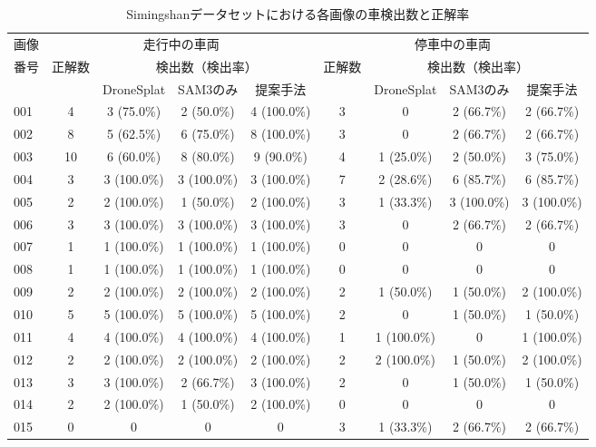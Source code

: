 \documentclass[a4paper,dvipdfmx,ja=standard,9pt]{bxjsarticle}
\begin{document}
\begin{table}[htbp]
  \centering
  \caption{Simingshanデータセットにおける各画像の車検出数と正解率}
  \small
  \begin{tabular}{lcccccccc}
    \toprule
    画像 & \multicolumn{4}{c}{走行中の車両} & \multicolumn{4}{c}{停車中の車両} \\
    \cmidrule(lr){2-5} \cmidrule(lr){6-9}
    番号 & 正解数 & \multicolumn{3}{c}{検出数（検出率）} & 正解数 & \multicolumn{3}{c}{検出数（検出率）} \\
    \cmidrule(lr){3-5} \cmidrule(lr){7-9}
     & & DroneSplat & SAM3のみ & 提案手法 & & DroneSplat & SAM3のみ & 提案手法 \\
    \midrule
    001 & 4 & 3 (75.0\%) & 2 (50.0\%) & 4 (100.0\%) & 3 & 0 & 2 (66.7\%) & 2 (66.7\%) \\
    002 & 8 & 5 (62.5\%) & 6 (75.0\%) & 8 (100.0\%) & 3 & 0 & 2 (66.7\%) & 2 (66.7\%) \\
    003 & 10 & 6 (60.0\%) & 8 (80.0\%) & 9 (90.0\%) & 4 & 1 (25.0\%) & 2 (50.0\%) & 3 (75.0\%) \\
    004 & 3 & 3 (100.0\%) & 3 (100.0\%) & 3 (100.0\%) & 7 & 2 (28.6\%) & 6 (85.7\%) & 6 (85.7\%) \\
    005 & 2 & 2 (100.0\%) & 1 (50.0\%) & 2 (100.0\%) & 3 & 1 (33.3\%) & 3 (100.0\%) & 3 (100.0\%) \\
    006 & 3 & 3 (100.0\%) & 3 (100.0\%) & 3 (100.0\%) & 3 & 0 & 2 (66.7\%) & 2 (66.7\%) \\
    007 & 1 & 1 (100.0\%) & 1 (100.0\%) & 1 (100.0\%) & 0 & 0 & 0 & 0 \\
    008 & 1 & 1 (100.0\%) & 1 (100.0\%) & 1 (100.0\%) & 0 & 0 & 0 & 0 \\
    009 & 2 & 2 (100.0\%) & 2 (100.0\%) & 2 (100.0\%) & 2 & 1 (50.0\%) & 1 (50.0\%) & 2 (100.0\%) \\
    010 & 5 & 5 (100.0\%) & 5 (100.0\%) & 5 (100.0\%) & 2 & 0 & 1 (50.0\%) & 1 (50.0\%) \\
    011 & 4 & 4 (100.0\%) & 4 (100.0\%) & 4 (100.0\%) & 1 & 1 (100.0\%) & 0 & 1 (100.0\%) \\
    012 & 2 & 2 (100.0\%) & 2 (100.0\%) & 2 (100.0\%) & 2 & 2 (100.0\%) & 1 (50.0\%) & 2 (100.0\%) \\
    013 & 3 & 3 (100.0\%) & 2 (66.7\%) & 3 (100.0\%) & 2 & 0 & 1 (50.0\%) & 1 (50.0\%) \\
    014 & 2 & 2 (100.0\%) & 1 (50.0\%) & 2 (100.0\%) & 0 & 0 & 0 & 0 \\
    015 & 0 & 0 & 0 & 0 & 3 & 1 (33.3\%) & 2 (66.7\%) & 2 (66.7\%) \\

\end{tabular}
\end{table}
\end{document}
